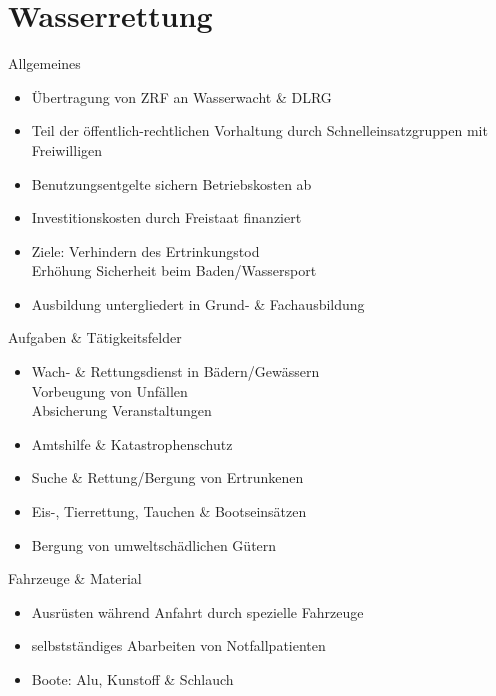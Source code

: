 \section{Wasserrettung}
\begin{sectionbox}{Allgemeines}
    \begin{itemize}
        \item Übertragung von ZRF an Wasserwacht \& DLRG
        \item Teil der öffentlich-rechtlichen Vorhaltung durch Schnelleinsatzgruppen mit Freiwilligen
        \item Benutzungsentgelte sichern Betriebskosten ab
        \item Investitionskosten durch Freistaat finanziert
        \item Ziele: Verhindern des Ertrinkungstod\\
        \ra Erhöhung Sicherheit beim Baden/Wassersport
        \item Ausbildung untergliedert in Grund- \& Fachausbildung
    \end{itemize}
\end{sectionbox}
\begin{sectionbox}{Aufgaben \& Tätigkeitsfelder}
    \begin{itemize}
        \item Wach- \& Rettungsdienst in Bädern/Gewässern\\
        \ra Vorbeugung von Unfällen\\
        \ra Absicherung Veranstaltungen
        \item Amtshilfe \& Katastrophenschutz
        \item Suche \& Rettung/Bergung von Ertrunkenen
        \item Eis-, Tierrettung, Tauchen \& Bootseinsätzen
        \item Bergung von umweltschädlichen Gütern
    \end{itemize}
\end{sectionbox}
\begin{sectionbox}{Fahrzeuge \& Material}
    \begin{itemize}
        \item Ausrüsten während Anfahrt durch spezielle Fahrzeuge
        \item selbstständiges Abarbeiten von Notfallpatienten
        \item Boote: Alu, Kunstoff \& Schlauch
    \end{itemize}
\end{sectionbox}